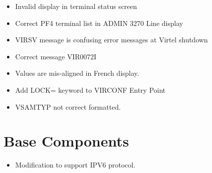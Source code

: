 \documentclass[letterpaper,10pt,english]{sphinxmanual}
\begin{document}
\begin{itemize}
\item {} 
Invalid display in terminal status screen

\end{itemize}

\begin{itemize}
\item {} 
Correct PF4 terminal list in ADMIN 3270 Line display

\end{itemize}

\begin{itemize}
\item {} 
VIRSV message is confusing error messages at Virtel shutdown

\end{itemize}

\begin{itemize}
\item {} 
Correct message VIR0072I

\end{itemize}

\begin{itemize}
\item {} 
Values are mis-aligned in French display.

\end{itemize}

\begin{itemize}
\item {} 
Add LOCK= keyword to VIRCONF Entry Point

\end{itemize}

\begin{itemize}
\item {} 
VSAMTYP not correct formatted.

\end{itemize}

\newpage


\section{Base Components}
\label{\detokenize{TN202101:base-components}}
\begin{itemize}
\item {} 
Modification to support IPV6 protocol.

\end{itemize}
\end{document}
